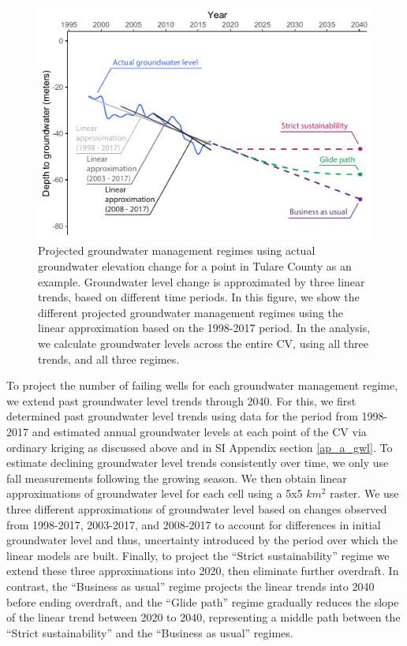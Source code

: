 \begin{figure}%
	\centering
	\includegraphics[width=\linewidth]{ch2_figs/fig_sgma.pdf}
	\caption{Projected groundwater management regimes using actual groundwater elevation change for a point in Tulare County as an example. Groundwater level change is approximated by three linear trends, based on different time periods. In this figure, we show the different projected groundwater management regimes using the linear approximation based on the 1998-2017 period. In the analysis, we calculate groundwater levels across the entire CV, using all three trends, and all three regimes.}
	\label{fig:SGMAscenarios}
\end{figure}

To project the number of failing wells for each groundwater management regime, we extend past groundwater level trends through 2040. For this, we first determined past groundwater level trends using data for the period from 1998-2017 and estimated annual groundwater levels at each point of the CV via ordinary kriging as discussed above and in SI Appendix section \ref{ap_a_gwl}. To estimate declining groundwater level trends consistently over time, we only use fall measurements following the growing season. We then obtain linear approximations of groundwater level for each cell using a 5x5 $km^2$ raster. We use three different approximations of groundwater level based on changes observed from 1998-2017, 2003-2017, and 2008-2017 to account for differences in initial groundwater level and thus, uncertainty introduced by the period over which the linear models are built. Finally, to project the ``Strict sustainability'' regime we extend these three approximations into 2020, then eliminate further overdraft. In contrast, the ``Business as usual'' regime projects the linear trends into 2040 before ending overdraft, and the ``Glide path'' regime gradually reduces the slope of the linear trend between 2020 to 2040, representing a middle path between the ``Strict sustainability'' and the ``Business as usual'' regimes. 




